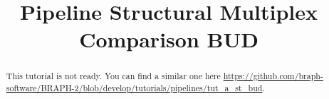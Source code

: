 \documentclass[justified]{tufte-handout}
\title{Pipeline Structural Multiplex Comparison BUD}
\begin{document}
\maketitle

\begin{abstract}
\noindent
This tutorial is not ready. You can find a similar one here \url{https://github.com/braph-software/BRAPH-2/blob/develop/tutorials/pipelines/tut_a_st_bud}.
\end{abstract}
\end{document}
